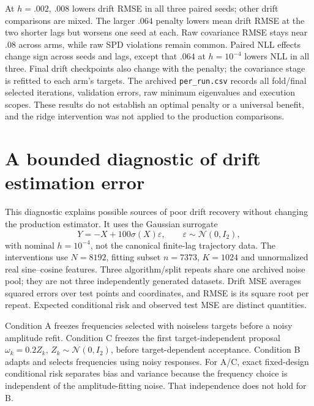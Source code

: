 At $h=.002$, $.008$ lowers drift RMSE in all three paired seeds; other drift comparisons are mixed. The larger $.064$ penalty lowers mean drift RMSE at the two shorter lags but worsens one seed at each. Raw covariance RMSE stays near .08 across arms, while raw SPD violations remain common. Paired NLL effects change sign across seeds and lags, except that $.064$ at $h=10^{-4}$ lowers NLL in all three. Final drift checkpoints also change with the penalty; the covariance stage is refitted to each arm's targets. The archived \texttt{per\_run.csv} records all fold/final selected iterations, validation errors, raw minimum eigenvalues and execution scopes. These results do not establish an optimal penalty or a universal benefit, and the ridge intervention was not applied to the production comparisons.

\section{A bounded diagnostic of drift estimation error}
\label{app:drift_diagnostic}
This diagnostic explains possible sources of poor drift recovery without changing the production estimator. It uses the Gaussian surrogate
\[
Y=-X+100\sigma(X)\varepsilon,\qquad \varepsilon\sim\mathcal N(0, I_2),
\]
with nominal $h=10^{-4}$, not the canonical finite-lag trajectory data.
The interventions use $N=8192$, fitting subset $n=7373$, $K=1024$ and unnormalized real sine--cosine features. Three algorithm/split repeats share one archived noise pool; they are not three independently generated datasets. Drift MSE averages squared errors over test points and coordinates, and RMSE is its square root per repeat. Expected conditional risk and observed test MSE are distinct quantities.

Condition A freezes frequencies selected with noiseless targets before a noisy amplitude refit. Condition C freezes the first target-independent proposal $\omega_k=0.2Z_k$, $Z_k\sim\mathcal N(0, I_2)$, before target-dependent acceptance. Condition B adapts and selects frequencies using noisy responses. For A/C, exact fixed-design conditional risk separates bias and variance because the frequency choice is independent of the amplitude-fitting noise. That independence does not hold for B.

